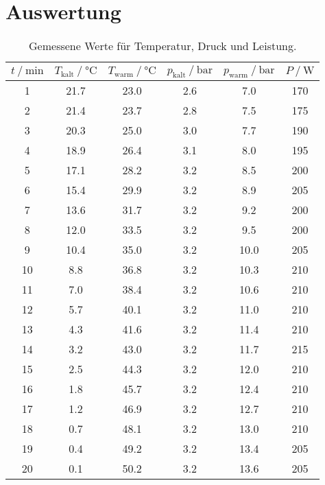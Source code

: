 \section{Auswertung}
\label{sec:Auswertung}

\begin{table}
  \centering
  \caption{Gemessene Werte für Temperatur, Druck und Leistung.}
  \label{tab:Mess1}
  \begin{tabular}{S[table-format=2] S[table-format=2.1] S S[table-format=1.1] S S[table-format=3]}
      \toprule
      {$t \mathbin{/} \text{min}$} & {$T_{\text{kalt}} \mathbin{/} \unit{\degreeCelsius}$} &%
      {$T_{\text{warm}} \mathbin{/} \unit{\degreeCelsius}$} & {$p_{\text{kalt}} \mathbin{/} \unit{\bar}$} &%
      {$p_{\text{warm}} \mathbin{/} \unit{\bar}$} & {$P \mathbin{/} \unit{\watt}$} \\
       & 21.7 & 23.0 & 2.6 &  7.0 & 170 \\
       2 & 21.4 & 23.7 & 2.8 &  7.5 & 175 \\
       3 & 20.3 & 25.0 & 3.0 &  7.7 & 190 \\
       4 & 18.9 & 26.4 & 3.1 &  8.0 & 195 \\
       5 & 17.1 & 28.2 & 3.2 &  8.5 & 200 \\
       6 & 15.4 & 29.9 & 3.2 &  8.9 & 205 \\
       7 & 13.6 & 31.7 & 3.2 &  9.2 & 200 \\
       8 & 12.0 & 33.5 & 3.2 &  9.5 & 200 \\
       9 & 10.4 & 35.0 & 3.2 & 10.0 & 205 \\
      10 &  8.8 & 36.8 & 3.2 & 10.3 & 210 \\
      11 &  7.0 & 38.4 & 3.2 & 10.6 & 210 \\
      12 &  5.7 & 40.1 & 3.2 & 11.0 & 210 \\
      13 &  4.3 & 41.6 & 3.2 & 11.4 & 210 \\
      14 &  3.2 & 43.0 & 3.2 & 11.7 & 215 \\
      15 &  2.5 & 44.3 & 3.2 & 12.0 & 210 \\
      16 &  1.8 & 45.7 & 3.2 & 12.4 & 210 \\
      17 &  1.2 & 46.9 & 3.2 & 12.7 & 210 \\
      18 &  0.7 & 48.1 & 3.2 & 13.0 & 210 \\
      19 &  0.4 & 49.2 & 3.2 & 13.4 & 205 \\
      20 &  0.1 & 50.2 & 3.2 & 13.6 & 205 \\
      \bottomrule
      \end{tabular}
  \end{table}
